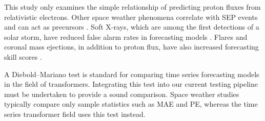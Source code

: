 This study only examines the simple relationship of predicting proton fluxes from relativistic electrons. Other space weather phenomena correlate with SEP events
and can act as precursors \cite{gopalswamy2024solar}. Soft X-rays, which are among the first detections of a solar storm, have reduced false alarm rates in forecasting models \cite{laurenza2009technique}.
Flares and coronal mass ejections, in addition to proton flux, have also increased forecasting skill scores \cite{yu2026}.

A Diebold--Mariano test \cite{diebold1995comparing} is standard for comparing time series forecasting models in the field of transformers. Integrating this test into
our current testing pipeline must be undertaken to provide a sound comparison. Space weather studies typically compare only sample statistics such as MAE and PE,
whereas the time series transformer field uses this test instead.

